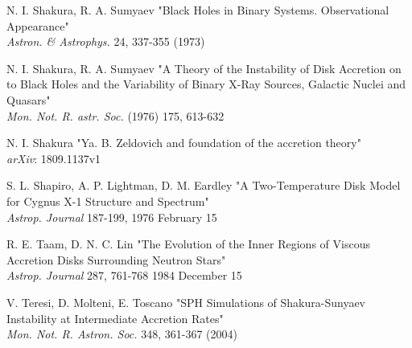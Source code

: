 \documentclass[a4paperbi]{article}
\begin{document}
\begin{thebibliography}{9}
	N. I. Shakura, R. A. Sumyaev 
	"Black Holes in Binary Systems. Observational Appearance"\\
	\textit{Astron. \& Astrophys.} 24, 337-355 (1973)
	
	N. I. Shakura, R. A. Sumyaev 
	"A Theory of the Instability of Disk Accretion on to Black Holes and the Variability of Binary X-Ray Sources, Galactic Nuclei and Quasars"\\
	\textit{Mon. Not. R. astr. Soc.} (1976) 175, 613-632
	
	N. I. Shakura
	"Ya. B. Zeldovich and foundation of the accretion theory"\\
	\textit{arXiv}: 1809.1137v1
	
	S. L. Shapiro, A. P. Lightman, D. M. Eardley 
	"A Two-Temperature Disk Model for Cygnus X-1 Structure and Spectrum"\\
	\textit{Astrop. Journal} 187-199, 1976 February 15
	
	R. E. Taam, D. N. C. Lin 
	"The Evolution of the Inner Regions of Viscous Accretion Disks Surrounding Neutron Stars"\\
	\textit{Astrop. Journal} 287, 761-768 1984 December 15
	
	V. Teresi, D. Molteni, E. Toscano 
	"SPH Simulations of Shakura-Sunyaev Instability at Intermediate Accretion Rates"\\
	\textit{Mon. Not. R. Astron. Soc.} 348, 361-367 (2004)
\end{thebibliography}
\end{document}
